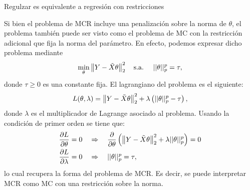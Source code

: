 \documentclass[handout, 9pt]{beamer}
\begin{document}
\begin{frame}{Regulzar es equivalente a regresión con restricciones}

Si bien el problema de MCR incluye una penalización sobre la norma de $\theta$, el problema también puede ser visto como el problema de MC con la restricción adicional que fija la norma del parámetro. \pause En efecto, podemos expresar dicho problema mediante
\begin{align*}
	\min_\theta  \left\lVert Y-\tilde{X}\theta\right\rVert_2^2\label{eq:dual_MCR1}
	\quad\text{s.a.} \quad \ ||\theta||_p^p = \tau,
\end{align*}
donde $\tau\geq0$ es una constante fija. \pause El lagrangiano del problema es el siguiente:
\begin{equation*}
	L(\theta,\lambda) = \left\lVert Y-\tilde{X}\theta\right\rVert_2^2 + \lambda \left(||\theta||_p^p - \tau\right),
\end{equation*}
donde $\lambda$ es el multiplicador de Lagrange asociado al problema. \pause Usando la condición de primer orden se tiene que: 
\begin{align*}
	\frac{\partial L}{\partial \theta} = 0 &\quad\Rightarrow\quad  \frac{\partial }{\partial \theta}\left(\left\lVert Y-\tilde{X}\theta\right\rVert_2^2 + \lambda ||\theta||_p^p \right) = 0\\
	\frac{\partial L}{\partial \lambda} = 0 &\quad\Rightarrow\quad ||\theta||_p^p = \tau,
\end{align*}\pause
lo cual recupera la forma del problema de MCR. Es decir, se puede interpretar MCR como MC con una restricción sobre la norma.

\end{frame}
\end{document}
